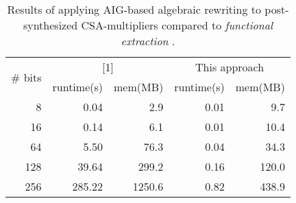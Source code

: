 \begin{table}[!htb]
\centering
\caption{Results of applying AIG-based algebraic rewriting to post-synthesized CSA-multipliers compared to \textit{functional extraction} \cite{ciesielski2015verification}.}
\label{tbl:post}
\begin{tabular}{|r|r|r|r|r|}
\hline
\multirow{2}{*}{\# bits} & \multicolumn{2}{c|}{{[}1{]}} & \multicolumn{2}{c|}{This approach} \\ \cline{2-5} 
 & runtime(s) & mem(MB) & runtime(s) & mem(MB) \\ \hline
8 & 0.04 & 2.9 & 0.01 & 9.7 \\ \hline
16 & 0.14 & 6.1 & 0.01 & 10.4 \\ \hline
64 & 5.50 & 76.3 & 0.04 & 34.3 \\ \hline
128 & 39.64 & 299.2 & 0.16 & 120.0 \\ \hline
256 & 285.22 & 1250.6 & 0.82 & 438.9 \\ \hline
\end{tabular}
\end{table}